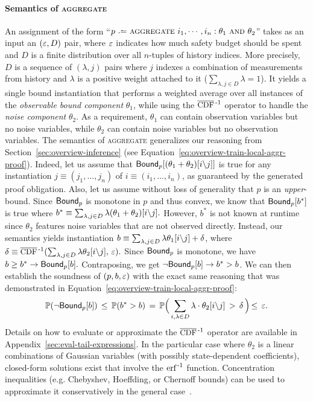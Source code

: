 \documentclass[acmsmall,screen,nonacm]{acmart}
\begin{document}
\paragraph{Semantics of \textsc{aggregate}}
An assignment of the form ``$p \slassign \slaggregate i_1, \cdots, i_n : \theta_1 \sland \theta_2$'' takes as an input an $(\varepsilon, D)$ pair, where $\varepsilon$ indicates how much safety budget should be spent and $D$ is a finite distribution over all $n$-tuples of history indices. More precisely, $D$ is a sequence of $(\lambda, j)$ pairs where $j$ indexes a combination of measurements from history and $\lambda$ is a positive weight attached to it ($\sum_{\lambda, j \in D} \lambda = 1$). It yields a single bound instantiation that performs a weighted average over all instances of the \emph{observable bound component} $\theta_1$, while using the $\InvCCDF$ operator to handle the \emph{noise component} $\theta_2$. As a requirement, $\theta_1$ can contain observation variables but no noise variables, while $\theta_2$ can contain noise variables but no observation variables. The semantics of \textsc{aggregate} generalizes our reasoning from Section~\ref{sec:overview-inference} (see Equation~\ref{eq:overview-train-local-aggr-proof}). Indeed, let us assume that
$\mathsf{Bound}_{p}[{(\theta_1 + \theta_2)}[i \backslash j]]$ is true for any instantiation $j \equiv (j_1, \dots, j_n)$ of $i \equiv (i_1, \dots, i_n)$, as guaranteed by the generated proof obligation. Also, let us assume without loss of generality that $p$ is an \emph{upper}-bound. Since $\mathsf{Bound}_p$ is monotone in $p$ and thus convex, we know that $\mathsf{Bound}_{p}[b^*]$ is true where
$ b^* \equiv \sum_{\lambda, j \in D} \lambda {(\theta_1 + \theta_2)}[i \backslash j]. $
However, $b^*$ is not known at runtime since $\theta_2$ features noise variables that are not observed directly. Instead, our semantics yields instantiation $b \equiv \sum_{\lambda,j \in D} \lambda  {\theta_1}[i \backslash j] + \delta$, where $\delta \equiv \InvCCDF(\sum_{\lambda, j \in D} \lambda \FSubst{\theta_2}{i}{j},\,\Eps).$
Since $\mathsf{Bound}_p$ is monotone, we have $b \ge b^* \rightarrow \mathsf{Bound}_{p}[b].$ Contraposing, we get $\neg \mathsf{Bound}_{p}[b] \rightarrow b^* > b$. We can then establish the soundness of $(p, b, \varepsilon)$ with the exact same reasoning that was demonstrated in Equation~\ref{eq:overview-train-local-aggr-proof}:
\begin{equation*}
  \mathbb{P}(\neg \mathsf{Bound}_{p}[b]) \,\le\, \mathbb{P}(b^* > b)
    \,=\, \mathbb{P} \Bigl( \,\sum_{i,\lambda \in D} \lambda \cdot {\theta_2}[i \backslash j] \,>\, \delta\, \Bigl)
    \,\le\, \varepsilon.
\end{equation*}
Details on how to evaluate or approximate the $\InvCCDF$ operator are available in Appendix~\ref{sec:eval-tail-expressions}. In the particular case where $\theta_2$ is a linear combinations of Gaussian variables (with possibly state-dependent coefficients), closed-form solutions exist that involve the $\operatorname{\text{erf}^{\,-1}}$ function. Concentration inequalities (e.g. Chebyshev, Hoeffding, or Chernoff bounds) can be used to approximate it conservatively in the general case~\cite{bertsekas2008introduction}.
\end{document}
